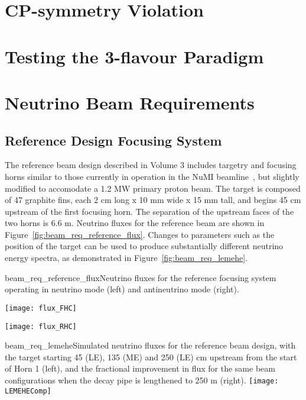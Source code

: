 \section{CP-symmetry Violation}
\label{sec:physics-lbnosc-cpv}

\section{Testing the 3-flavour Paradigm}
\label{sec:physics-lbnosc-3nutests}

\section{Neutrino Beam Requirements}
\label{sec:physics-lbnosc-beam-req}

\subsection{Reference Design Focusing System}
\label{subsec:reference-design-focusing-system}
The reference beam design described in Volume 3 includes targetry and
focusing horns similar to those currently in operation in the NuMI
beamline~\cite{numitdr}, but slightly modified to accomodate a 1.2 MW primary proton beam.  The
target is composed of 47 graphite fins, each 2 cm long x 10 mm wide x
15 mm tall, and begins 45 cm upstream of the first focusing horn.  The separation
of the upstream faces of the two horns is 6.6 m.  Neutrino fluxes for the reference beam are
shown in Figure~\ref{fig:beam_req_reference_flux}.  Changes to
parameters such as the position of the target can be used to produce substantially different neutrino
energy spectra, as demonstrated in Figure~\ref{fig:beam_req_lemehe}.

\begin{cdrfigure}{beam_req_reference_flux}{Neutrino fluxes for the reference 
    focusing system operating in neutrino mode (left) and antineutrino 
    mode (right).} 
\centering 
\begin{minipage}{0.45\textwidth}
\centering 
\texttt{[image: flux\_FHC]}
\end{minipage}\hfill 
\begin{minipage}{0.45\textwidth}
\centering 
\texttt{[image: flux\_RHC]}
\end{minipage}
\end{cdrfigure}
\begin{cdrfigure} {beam_req_lemehe}{Simulated neutrino fluxes for the 
    reference beam design, with the target starting 45 (LE), 135 (ME) 
    and 250 (LE) cm upstream from the start of Horn 1 (left), and the
    fractional improvement in flux for the same beam configurations 
    when the decay pipe is lengthened to 250 m (right).}
    \texttt{[image: LEMEHEComp]}
  \end{cdrfigure}
